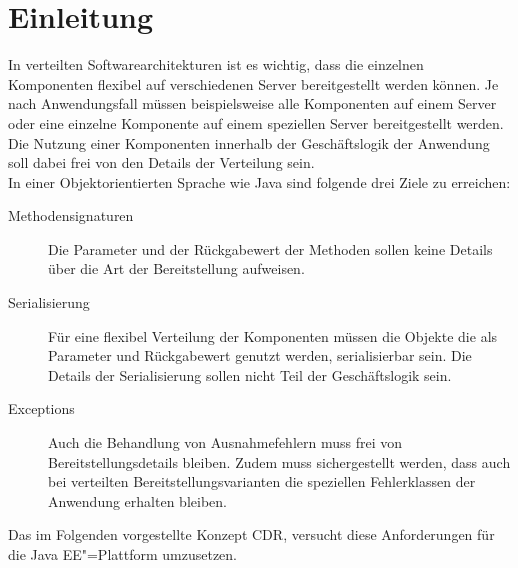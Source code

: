\section{Einleitung\label{sec:introduction}}
In verteilten Softwarearchitekturen ist es wichtig, dass die einzelnen Komponenten flexibel auf verschiedenen Server bereitgestellt werden können. 
Je nach Anwendungsfall müssen beispielsweise alle Komponenten auf einem Server oder eine einzelne Komponente auf einem speziellen Server bereitgestellt werden. 
Die Nutzung einer Komponenten innerhalb der Geschäftslogik der Anwendung soll dabei frei von den Details der Verteilung sein.\\
In einer Objektorientierten Sprache wie Java sind folgende drei Ziele zu erreichen:
\begin{description}
\item[Methodensignaturen] Die Parameter und der Rückgabewert der Methoden sollen keine Details über die Art der Bereitstellung aufweisen.
\item[Serialisierung] Für eine flexibel Verteilung der Komponenten müssen die Objekte die als Parameter und Rückgabewert genutzt werden, serialisierbar sein. Die Details der Serialisierung sollen nicht Teil der Geschäftslogik sein. 
\item[Exceptions] Auch die Behandlung von Ausnahmefehlern muss frei von Bereitstellungsdetails bleiben. Zudem muss sichergestellt werden, dass auch bei verteilten Bereitstellungsvarianten die speziellen Fehlerklassen der Anwendung erhalten bleiben.    
\end{description}
Das im Folgenden vorgestellte Konzept \ac{CDR}, versucht diese Anforderungen für die \ac{Java EE}"=Plattform umzusetzen.
